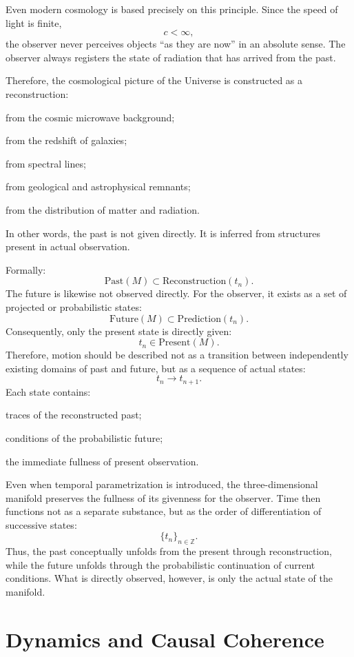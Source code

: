 \documentclass[12pt,a4paper]{article}
\theoremstyle{definition}
\begin{document}
Even modern cosmology is based precisely on this principle. Since the speed of light is finite,
\[
c < \infty,
\]
the observer never perceives objects ``as they are now'' in an absolute sense. The observer always registers the state of radiation that has arrived from the past.

Therefore, the cosmological picture of the Universe is constructed as a reconstruction:

from the cosmic microwave background;

from the redshift of galaxies;

from spectral lines;

from geological and astrophysical remnants;

from the distribution of matter and radiation.

In other words, the past is not given directly. It is inferred from structures present in actual observation.

Formally:
\[
\mathrm{Past}(M)
\subset
\mathrm{Reconstruction}(t_n).
\]
The future is likewise not observed directly. For the observer, it exists as a set of projected or probabilistic states:
\[
\mathrm{Future}(M)
\subset
\mathrm{Prediction}(t_n).
\]
Consequently, only the present state is directly given:
\[
t_n \in \mathrm{Present}(M).
\]
Therefore, motion should be described not as a transition between independently existing domains of past and future, but as a sequence of actual states:
\[
t_n \longrightarrow t_{n+1}.
\]
Each state contains:

traces of the reconstructed past;

conditions of the probabilistic future;

the immediate fullness of present observation.

Even when temporal parametrization is introduced, the three-dimensional manifold preserves the fullness of its givenness for the observer. Time then functions not as a separate substance, but as the order of differentiation of successive states:
\[
\{t_n\}_{n\in\mathbb{Z}}.
\]
Thus, the past conceptually unfolds from the present through reconstruction, while the future unfolds through the probabilistic continuation of current conditions. What is directly observed, however, is only the actual state of the manifold.



\section{Dynamics and Causal Coherence}
\end{document}
